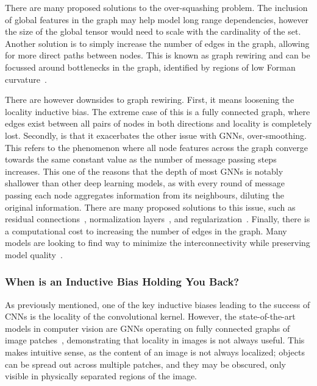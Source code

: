 There are many proposed solutions to the over-squashing problem.
The inclusion of global features in the graph may help model long range dependencies, however the size of the global tensor would need to scale with the cardinality of the set.
Another solution is to simply increase the number of edges in the graph, allowing for more direct paths between nodes.
This is known as graph rewiring and can be focussed around bottlenecks in the graph, identified by regions of low Forman curvature~\cite{UnderstandingOversquashingBottlenecks}.

There are however downsides to graph rewiring.
First, it means loosening the locality inductive bias.
The extreme case of this is a fully connected graph, where edges exist between all pairs of nodes in both directions and locality is completely lost.
Secondly, is that it exacerbates the other issue with GNNs, over-smoothing.
This refers to the phenomenon where all node features across the graph converge towards the same constant value as the number of message passing steps increases.
This one of the reasons that the depth of most GNNs is notably shallower than other deep learning models, as with every round of message passing each node aggregates information from its neighbours, diluting the original information.
There are many proposed solutions to this issue, such as residual connections~\cite{DeepGCNs}, normalization layers~\cite{PairNorm}, and regularization~\cite{DirichletEnergyConstrained}.
Finally, there is a computational cost to increasing the number of edges in the graph.
Many models are looking to find way to minimize the interconnectivity while preserving model quality~\cite{GeneratingLongSequences}.

\subsubsection{When is an Inductive Bias Holding You Back?}

As previously mentioned, one of the key inductive biases leading to the success of CNNs is the locality of the convolutional kernel.
However, the state-of-the-art models in computer vision are GNNs operating on fully connected graphs of image patches~\cite{VisionTransformer}, demonstrating that locality in images is not always useful.
This makes intuitive sense, as the content of an image is not always localized; objects can be spread out across multiple patches, and they may be obscured, only visible in physically separated regions of the image.

